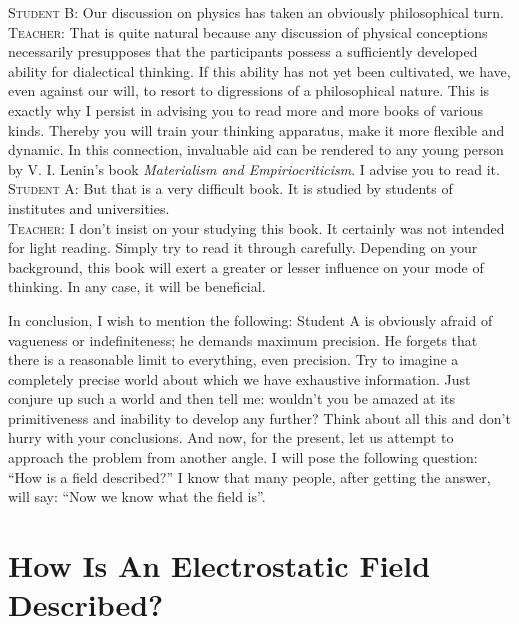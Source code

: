 \documentclass[a4paper,sfsidenotes]{tufte-book}
\begin{document}
\textsc{Student B:} Our discussion on physics has taken an obviously philosophical turn.
\\
\textsc{Teacher:} That is quite natural because any discussion of physical conceptions necessarily presupposes that the participants possess a sufficiently developed ability for dialectical thinking. If this ability has not yet been cultivated, we have, even against our will, to resort to digressions of a philosophical nature. This is exactly why I persist in advising you to read more and more books of various kinds. Thereby you will train your thinking apparatus, make it more flexible and dynamic. In this connection, invaluable aid can be rendered to any young person by V. I. Lenin's book \emph{Materialism and Empiriocriticism}. I advise you to read it.
\\
\textsc{Student A:} But that is a very difficult book. It is studied by students of institutes and universities.
\\
\textsc{Teacher:} I don't insist on your studying this book. It certainly was not intended for light reading. Simply try to read it through carefully. Depending on your background, this book will exert a greater or lesser influence on your mode of thinking. In any case, it will be beneficial.

In conclusion, I wish to mention the following: Student A is obviously afraid of vagueness or indefiniteness; he demands maximum precision. He forgets that there is a reasonable limit to everything, even precision. Try to imagine a completely precise world about which we have exhaustive information. Just conjure up such a world and then tell me: wouldn't you be amazed at its primitiveness and inability to develop any further? Think about all this and don't hurry with your conclusions. And now, for the present, let us attempt to approach the problem from another angle. I will pose the following question: ``How is a field described?'' I know that many people, after getting the answer, will say: ``Now we know what the field is''.


\chapter{How Is An Electrostatic Field Described?}
\label{ch-23}
\end{document}
